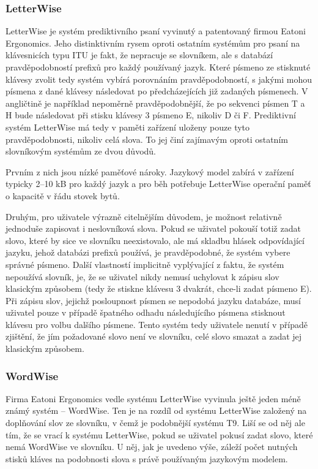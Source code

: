 \documentclass[a4paper,11pt]{article}
\begin{document}
\subsubsection{LetterWise}

LetterWise je systém prediktivního psaní vyvinutý a patentovaný firmou Eatoni Ergonomics. Jeho distinktivním rysem oproti ostatním systémům pro psaní na klávesnicích typu ITU je fakt, že nepracuje se slovníkem, ale s databází pravděpodobností prefixů pro každý používaný jazyk. Které písmeno ze stisknuté klávesy zvolit tedy systém vybírá porovnáním pravděpodobností, s jakými mohou písmena z dané klávesy následovat po předcházejících již zadaných písmenech. V angličtině je například nepoměrně pravděpodobnější, že po sekvenci písmen T a H bude následovat při stisku klávesy 3 písmeno E, nikoliv D či F. Prediktivní systém LetterWise má tedy v paměti zařízení uloženy pouze tyto pravděpodobnosti, nikoliv celá slova. \cite{MacKenzie2001} To jej činí zajímavým oproti ostatním slovníkovým systémům ze dvou důvodů.

Prvním z nich jsou nízké paměťové nároky. Jazykový model zabírá v zařízení typicky 2--10 kB pro každý jazyk a pro běh potřebuje LetterWise operační paměť o kapacitě v řádu stovek bytů. %

Druhým, pro uživatele výrazně citelnějším důvodem, je možnost relativně jednoduše zapisovat i neslovníková slova. Pokud se uživatel pokouší totiž zadat slovo, které by sice ve slovníku neexistovalo, ale má skladbu hlásek odpovídající jazyku, jehož databázi prefixů používá, je pravděpodobné, že systém vybere správné písmeno. Další vlastností implicitně vyplývající z faktu, že systém nepoužívá slovník, je, že se uživatel nikdy nemusí uchylovat k zápisu slov klasickým způsobem (tedy že stiskne klávesu 3 dvakrát, chce-li zadat písmeno E). Při zápisu slov, jejichž posloupnost písmen se nepodobá jazyku databáze, musí uživatel pouze v případě špatného odhadu následujícího písmena stisknout klávesu pro volbu dalšího písmene. Tento systém tedy uživatele nenutí v případě zjištění, že jím požadované slovo není ve slovníku, celé slovo smazat a zadat jej klasickým způsobem. \cite{MacKenzie2001} \cite{Ghayoomi2009}

\subsubsection{WordWise}

Firma Eatoni Ergonomics vedle systému LetterWise vyvinula ještě jeden méně známý systém -- WordWise. Ten je na rozdíl od systému LetterWise založený na doplňování slov ze slovníku, v čemž je podobnější systému T9. Liší se od něj ale tím, že se vrací k systému LetterWise, pokud se uživatel pokusí zadat slovo, které nemá WordWise ve slovníku. U něj, jak je uvedeno výše, záleží počet nutných stisků kláves na podobnosti slova s právě používaným jazykovým modelem.
\end{document}
